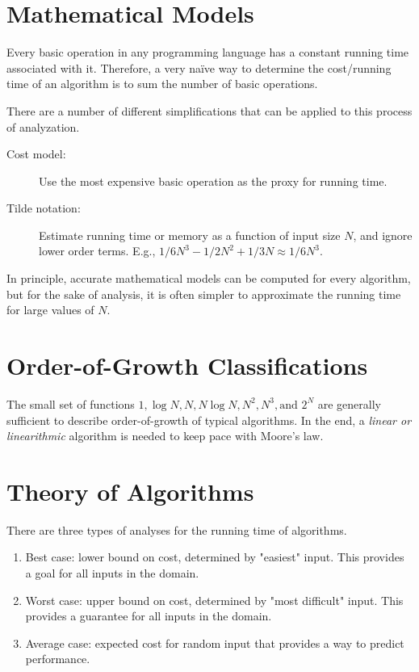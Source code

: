 \documentclass[11pt]{article}
\begin{document}
\section{Mathematical Models}
	Every basic operation in any programming language has a constant running time associated with it. Therefore, a very na\"{i}ve way to determine the cost/running time of an algorithm is to sum the number of basic operations.
	
	There are a number of different simplifications that can be applied to this process of analyzation.
	\begin{description}
		\item[Cost model:] Use the most expensive basic operation as the proxy for running time.
		\item[Tilde notation:] Estimate running time or memory as a function of input size $N$, and ignore lower order terms. E.g., $1/6 N^3 - 1/2 N^2 + 1/3 N \approx 1/6 N^3$.
	\end{description}
	
	In principle, accurate mathematical models can be computed for every algorithm, but for the sake of analysis, it is often simpler to approximate the running time for large values of $N$.
	
\section{Order-of-Growth Classifications}
	The small set of functions $1, \log N, N, N\log N, N^2, N^3, \text{and } 2^N$ are generally sufficient to describe order-of-growth of typical algorithms. In the end, a \textit{linear or linearithmic} algorithm is needed to keep pace with Moore's law.
	
\section{Theory of Algorithms}
	There are three types of analyses for the running time of algorithms.
	\begin{enumerate}
		\item Best case: lower bound on cost, determined by "easiest" input. This provides a goal for all inputs in the domain.
		\item Worst case: upper bound on cost, determined by "most difficult" input. This provides a guarantee for all inputs in the domain.
		\item Average case: expected cost for random input that provides a way to predict performance.
	\end{enumerate}
	
\end{document}
